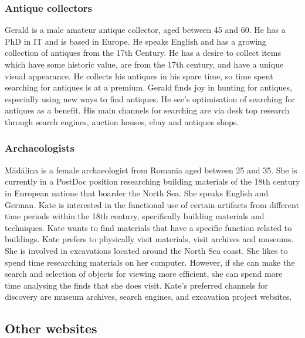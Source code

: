 \subsubsection{Antique collectors}

Gerald is a male amateur antique collector, aged between 45 and 60.  He has a PhD in IT and is based in Europe.  He speaks English and has a growing collection of antiques from the 17th Century.  He has a desire to collect items which have some historic value, are from the 17th century, and have a unique visual appearance.  He collects his antiques in his spare time, so time spent searching for antiques is at a premium.  Gerald finds joy in hunting for antiques, especially using new ways to find antiques.  He see's optimisation of searching for antiques as a benefit.  His main channels for searching are via desk top research through search engines, auction houses, ebay and antiques shops.

\subsubsection{Archaeologists}

Mădălina is a female archaeologist from Romania aged between 25 and 35.  She is currently in a PostDoc position researching building materials of the 18th century in European nations that boarder the North Sea.  She speaks English and German.  Kate is interested in the functional use of certain artifacts from different time periods within the 18th century, specifically building materials and techniques. Kate wants to find materials that have a specific function related to buildings.  Kate prefers to physically visit materials, visit archives and museums.  She is involved in excavations located around the North Sea coast.  She likes to spend time researching materials on her computer.  However, if she can make the search and selection of objects for viewing more efficient, she can spend more time analysing the finds that she does visit.  Kate's preferred channels for discovery are museum archives, search engines, and excavation project websites.

\subsection{Other websites}

